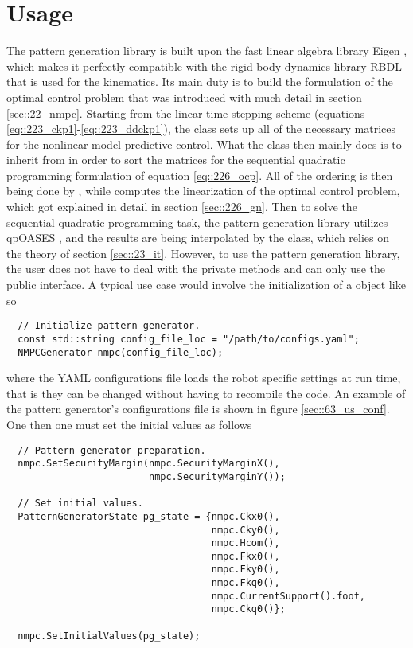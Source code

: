 \FloatBarrier
\section{Usage}
\label{sec::63_us}
The pattern generation library is built upon the fast linear algebra library Eigen \cite{eigenweb}, which makes it perfectly compatible with the rigid body dynamics library RBDL \cite{felis2017rbdl} that is used for the kinematics. Its main duty is to build the formulation of the optimal control problem that was introduced with much detail in section \ref{sec::22_nmpc}. Starting from the linear time-stepping scheme (equations \ref{eq::223_ckp1}-\ref{eq::223_ddckp1}), the  class sets up all of the necessary matrices for the nonlinear model predictive control. What the  class then mainly does is to inherit from  in order to sort the matrices for the sequential quadratic programming formulation of equation \ref{eq::226_ocp}. All of the ordering is then being done by , while  computes the linearization of the optimal control problem, which got explained in detail in section \ref{sec::226_gn}. Then to solve the sequential quadratic programming task, the pattern generation library utilizes qpOASES \cite{ferreau2014qpoases}, and the results are being interpolated by the  class, which relies on the theory of section \ref{sec::23_it}. However, to use the pattern generation library, the user does not have to deal with the private methods and can only use the public interface. A typical use case would involve the initialization of a  object like so
\begin{verbatim}
  // Initialize pattern generator.
  const std::string config_file_loc = "/path/to/configs.yaml";
  NMPCGenerator nmpc(config_file_loc);
\end{verbatim} 
where the YAML configurations file loads the robot specific settings at run time, that is they can be changed without having to recompile the code. An example of the pattern generator's configurations file is shown in figure \ref{sec::63_us_conf}. One then one must set the initial values as follows
\begin{verbatim}
  // Pattern generator preparation.
  nmpc.SetSecurityMargin(nmpc.SecurityMarginX(), 
                         nmpc.SecurityMarginY());
	
  // Set initial values.
  PatternGeneratorState pg_state = {nmpc.Ckx0(),
                                    nmpc.Cky0(),
                                    nmpc.Hcom(),
                                    nmpc.Fkx0(),
                                    nmpc.Fky0(),
                                    nmpc.Fkq0(),
                                    nmpc.CurrentSupport().foot,
                                    nmpc.Ckq0()};

  nmpc.SetInitialValues(pg_state);
\end{verbatim}
